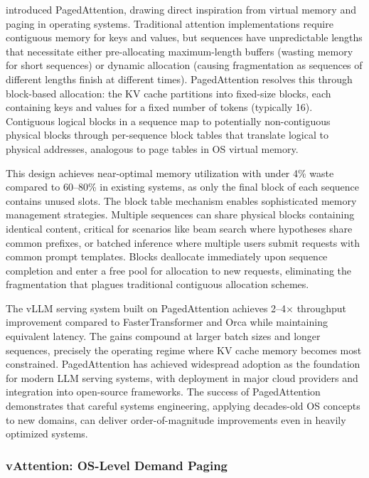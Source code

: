 \citet{kwon2023efficient} introduced PagedAttention, drawing direct inspiration from virtual memory and paging in operating systems. Traditional attention implementations require contiguous memory for keys and values, but sequences have unpredictable lengths that necessitate either pre-allocating maximum-length buffers (wasting memory for short sequences) or dynamic allocation (causing fragmentation as sequences of different lengths finish at different times). PagedAttention resolves this through block-based allocation: the KV cache partitions into fixed-size blocks, each containing keys and values for a fixed number of tokens (typically 16). Contiguous logical blocks in a sequence map to potentially non-contiguous physical blocks through per-sequence block tables that translate logical to physical addresses, analogous to page tables in OS virtual memory.

This design achieves near-optimal memory utilization with under 4\% waste compared to 60--80\% in existing systems, as only the final block of each sequence contains unused slots. The block table mechanism enables sophisticated memory management strategies. Multiple sequences can share physical blocks containing identical content, critical for scenarios like beam search where hypotheses share common prefixes, or batched inference where multiple users submit requests with common prompt templates. Blocks deallocate immediately upon sequence completion and enter a free pool for allocation to new requests, eliminating the fragmentation that plagues traditional contiguous allocation schemes.

The vLLM serving system built on PagedAttention achieves 2--4$\times$ throughput improvement compared to FasterTransformer and Orca while maintaining equivalent latency. The gains compound at larger batch sizes and longer sequences, precisely the operating regime where KV cache memory becomes most constrained. PagedAttention has achieved widespread adoption as the foundation for modern LLM serving systems, with deployment in major cloud providers and integration into open-source frameworks. The success of PagedAttention demonstrates that careful systems engineering, applying decades-old OS concepts to new domains, can deliver order-of-magnitude improvements even in heavily optimized systems.

\subsubsection{vAttention: OS-Level Demand Paging}

